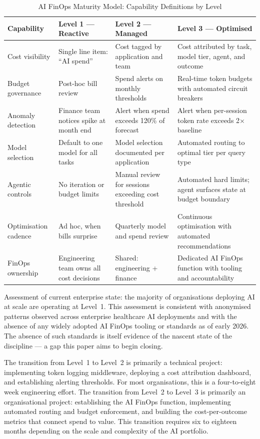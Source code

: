 \documentclass[11pt,twocolumn]{article}
\begin{document}
\begin{table}[t]
\centering
\caption{AI FinOps Maturity Model: Capability Definitions by Level}
\label{tab:maturity}
\small
\begin{tabularx}{\textwidth}{L{2.1cm} L{3.8cm} L{3.8cm} L{3.8cm}}
\toprule
\textbf{Capability} & \textbf{Level 1 --- Reactive} & \textbf{Level 2 --- Managed} & \textbf{Level 3 --- Optimised} \\
\midrule
Cost visibility &
  Single line item: ``AI spend'' &
  Cost tagged by application and team &
  Cost attributed by task, model tier, agent, and outcome \\
\addlinespace
Budget governance &
  Post-hoc bill review &
  Spend alerts on monthly thresholds &
  Real-time token budgets with automated circuit breakers \\
\addlinespace
Anomaly detection &
  Finance team notices spike at month end &
  Alert when spend exceeds 120\% of forecast &
  Alert when per-session token rate exceeds 2$\times$ baseline \\
\addlinespace
Model selection &
  Default to one model for all tasks &
  Model selection documented per application &
  Automated routing to optimal tier per query type \\
\addlinespace
Agentic controls &
  No iteration or budget limits &
  Manual review for sessions exceeding cost threshold &
  Automated hard limits; agent surfaces state at budget boundary \\
\addlinespace
Optimisation cadence &
  Ad hoc, when bills surprise &
  Quarterly model and spend review &
  Continuous optimisation with automated recommendations \\
\addlinespace
FinOps ownership &
  Engineering team owns all cost decisions &
  Shared: engineering + finance &
  Dedicated AI FinOps function with tooling and accountability \\
\bottomrule
\end{tabularx}
\end{table}

Assessment of current enterprise state: the majority of organisations deploying
AI at scale are operating at Level~1. This assessment is consistent with
anonymised patterns observed across enterprise healthcare AI deployments and
with the absence of any widely adopted AI FinOps tooling or standards as of
early 2026. The absence of such standards is itself evidence of the nascent
state of the discipline --- a gap this paper aims to begin closing.

The transition from Level~1 to Level~2 is primarily a technical project:
implementing token logging middleware, deploying a cost attribution dashboard,
and establishing alerting thresholds. For most organisations, this is a
four-to-eight week engineering effort. The transition from Level~2 to Level~3
is primarily an organisational project: establishing the AI FinOps function,
implementing automated routing and budget enforcement, and building the
cost-per-outcome metrics that connect spend to value. This transition requires
six to eighteen months depending on the scale and complexity of the AI portfolio.
\end{document}
